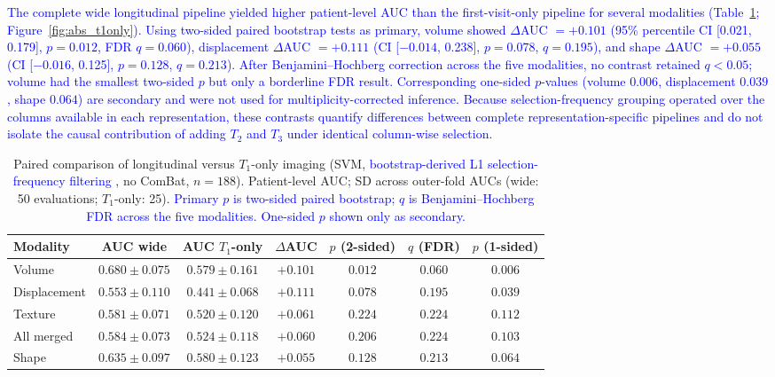 \documentclass[review]{elsarticle}
\newcommand{\corrigir}[2]{%
	\textcolor{red}{\sout{#1}} %
	\textcolor{blue}{#2}%
}
\begin{document}
	\corrigir{}{The complete wide longitudinal pipeline yielded higher patient-level AUC than the first-visit-only pipeline for several modalities (Table~\ref{tab:abs_vs_t1}; Figure~\ref{fig:abs_t1only}). Using two-sided paired bootstrap tests as primary, volume showed $\Delta$AUC $=+0.101$ (95\% percentile CI [0.021, 0.179], $p=0.012$, FDR $q=0.060$), displacement $\Delta$AUC $=+0.111$ (CI [$-0.014$, 0.238], $p=0.078$, $q=0.195$), and shape $\Delta$AUC $=+0.055$ (CI [$-0.016$, 0.125], $p=0.128$, $q=0.213$). After Benjamini--Hochberg correction across the five modalities, no contrast retained $q<0.05$; volume had the smallest two-sided $p$ but only a borderline FDR result. Corresponding one-sided $p$-values (volume $0.006$, displacement $0.039$, shape $0.064$) are secondary and were not used for multiplicity-corrected inference.} \corrigir{}{Because selection-frequency grouping operated over the columns available in each representation, these contrasts quantify differences between complete representation-specific pipelines and do not isolate the causal contribution of adding $T_2$ and $T_3$ under identical column-wise selection.}
	
	\begin{table}[htbp]
		\centering
		\footnotesize
		\caption{Paired comparison of longitudinal versus $T_1$-only imaging (SVM, \corrigir{}{bootstrap-derived L1 selection-frequency filtering}, no ComBat, $n=188$). Patient-level AUC; SD across outer-fold AUCs (wide: 50 evaluations; $T_1$-only: 25). \corrigir{}{Primary $p$ is two-sided paired bootstrap; $q$ is Benjamini--Hochberg FDR across the five modalities. One-sided $p$ shown only as secondary.}}
		\label{tab:abs_vs_t1}
		\begin{tabular}{lcccccc}
			\toprule
			Modality & AUC wide & AUC $T_1$-only & $\Delta$AUC & $p$ (2-sided) & $q$ (FDR) & $p$ (1-sided) \\
			\midrule
			Volume       & $0.680 \pm 0.075$ & $0.579 \pm 0.161$ & $+0.101$ & $0.012$ & $0.060$ & $0.006$ \\
			Displacement & $0.553 \pm 0.110$ & $0.441 \pm 0.068$ & $+0.111$ & $0.078$ & $0.195$ & $0.039$ \\
			Texture      & $0.581 \pm 0.071$ & $0.520 \pm 0.120$ & $+0.061$ & $0.224$ & $0.224$ & $0.112$ \\
			All merged   & $0.584 \pm 0.073$ & $0.524 \pm 0.118$ & $+0.060$ & $0.206$ & $0.224$ & $0.103$ \\
			Shape        & $0.635 \pm 0.097$ & $0.580 \pm 0.123$ & $+0.055$ & $0.128$ & $0.213$ & $0.064$ \\
			\bottomrule
		\end{tabular}
	\end{table}
	
\end{document}
